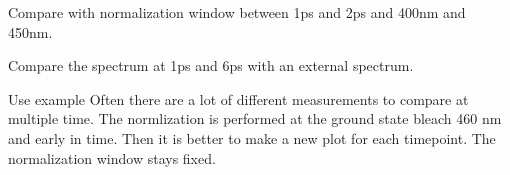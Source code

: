 \documentclass[letterpaper,10pt,english]{sphinxmanual}
\begin{document}
\begin{fulllineitems}
\begin{fulllineitems}
Compare with normalization window between 1ps and 2ps and 400nm and 450nm.

\begin{sphinxVerbatim}[commandchars=\\\{\}]
\PYG{p}{[}\PYG{p}{]}
  \PYG{p}{[}\PYG{p}{]}      
\end{sphinxVerbatim}

Compare the spectrum at 1ps and 6ps with an external spectrum.

\begin{sphinxVerbatim}[commandchars=\\\{\}]
     
  \PYG{p}{[}\PYG{p}{]}   
\end{sphinxVerbatim}

Use example \sphinxhyphen{}  Often there are a lot of different measurements to
compare at multiple time. The normlization is performed at the ground state bleach
460 nm and early in time. Then it is better to make a new plot for each
timepoint. The normalization window stays fixed.


\end{fulllineitems}
\end{fulllineitems}
\end{document}

